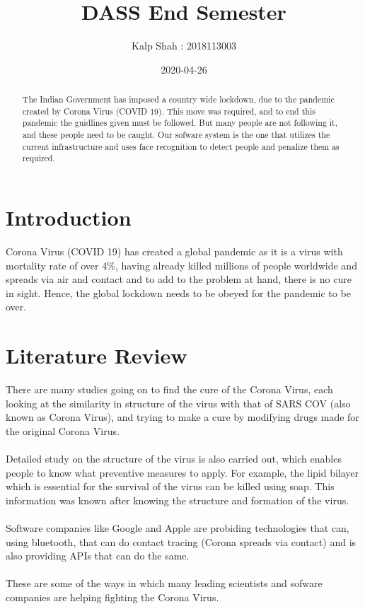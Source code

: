 \documentclass[10pt,twocolumn,letterpaper]{article}
\title{DASS End Semester}
\date{2020-04-26}
\author{Kalp Shah : 2018113003}
\begin{document}
\maketitle
\begin{abstract}
The Indian Government has imposed a country wide lockdown, due to the 
pandemic created by Corona Virus (COVID 19). This move was required, 
and to end this pandemic the guidlines given must be followed. But many 
people are not following it, and these people need to be caught. Our 
sofware system is the one that utilizes the current infrastructure and 
uses face recognition to detect people and penalize them as required.

\end{abstract}

\section*{Introduction}
Corona Virus (COVID 19) has created a global pandemic as it is a virus with 
mortality rate of over 4\%, having already killed millions of people worldwide 
and spreads via air and contact and to add to the problem at hand, there is no 
cure in sight. Hence, the global lockdown needs to be obeyed for the pandemic 
to be over.

\section*{Literature Review}
There are many studies going on to find the cure of the Corona Virus, each 
looking at the similarity in structure of the virus with that of SARS COV (also 
known as Corona Virus), and trying to make a cure by modifying drugs made 
for the original Corona Virus.
\\\\
Detailed study on the structure of the virus is also carried out, which 
enables people to know what preventive measures to apply. For example, the 
lipid bilayer which is essential for the survival of the virus can be killed 
using soap. This information was known after knowing the structure and formation 
of the virus.
\\\\
Software companies like Google and Apple are probiding technologies that can, 
using bluetooth, that can do contact tracing (Corona spreads via contact) and 
is also providing APIs that can do the same.
\\\\
These are some of the ways in which many leading scientists and sofware 
companies are helping fighting the Corona Virus.
\end{document}

